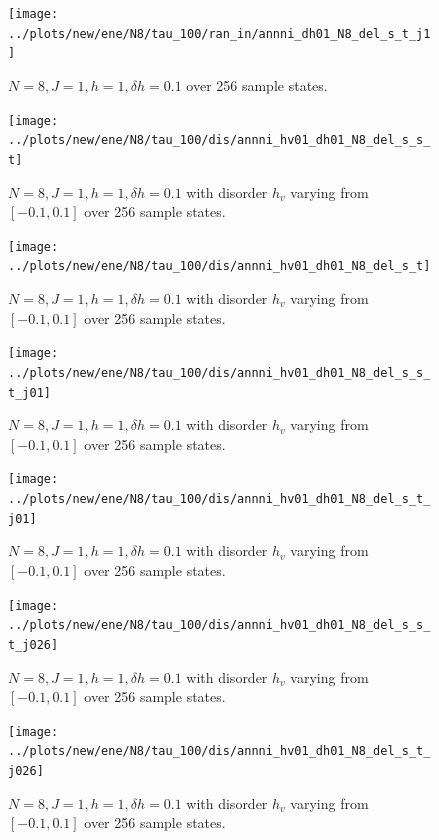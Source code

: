 \documentclass[a4paper]{article}
\begin{document}
\begin{figure}[h!]
  \centering
  \texttt{[image: ../plots/new/ene/N8/tau\_100/ran\_in/annni\_dh01\_N8\_del\_s\_t\_j1]}
  \caption{$N = 8, J = 1, h = 1, \delta h=0.1$ over 256 sample states.}
  \label{fig:}
\end{figure}



\begin{figure}[h!]
  \centering
  \texttt{[image: ../plots/new/ene/N8/tau\_100/dis/annni\_hv01\_dh01\_N8\_del\_s\_s\_t]}
  \caption{$N = 8, J = 1, h = 1, \delta h=0.1$ with disorder $h_v$ varying from $[-0.1,0.1]$ over 256 sample states.}
  \label{fig:}
\end{figure}

\begin{figure}[h!]
  \centering
  \texttt{[image: ../plots/new/ene/N8/tau\_100/dis/annni\_hv01\_dh01\_N8\_del\_s\_t]}
  \caption{$N = 8, J = 1, h = 1, \delta h=0.1$ with disorder $h_v$ varying from $[-0.1,0.1]$ over 256 sample states.}
  \label{fig:}
\end{figure}

\begin{figure}[h!]
  \centering
  \texttt{[image: ../plots/new/ene/N8/tau\_100/dis/annni\_hv01\_dh01\_N8\_del\_s\_s\_t\_j01]}
  \caption{$N = 8, J = 1, h = 1, \delta h=0.1$ with disorder $h_v$ varying from $[-0.1,0.1]$ over 256 sample states.}
  \label{fig:}
\end{figure}

\begin{figure}[h!]
  \centering
  \texttt{[image: ../plots/new/ene/N8/tau\_100/dis/annni\_hv01\_dh01\_N8\_del\_s\_t\_j01]}
  \caption{$N = 8, J = 1, h = 1, \delta h=0.1$ with disorder $h_v$ varying from $[-0.1,0.1]$ over 256 sample states.}
  \label{fig:}
\end{figure}

\begin{figure}[h!]
  \centering
  \texttt{[image: ../plots/new/ene/N8/tau\_100/dis/annni\_hv01\_dh01\_N8\_del\_s\_s\_t\_j026]}
  \caption{$N = 8, J = 1, h = 1, \delta h=0.1$ with disorder $h_v$ varying from $[-0.1,0.1]$ over 256 sample states.}
  \label{fig:}
\end{figure}

\begin{figure}[h!]
  \centering
  \texttt{[image: ../plots/new/ene/N8/tau\_100/dis/annni\_hv01\_dh01\_N8\_del\_s\_t\_j026]}
  \caption{$N = 8, J = 1, h = 1, \delta h=0.1$ with disorder $h_v$ varying from $[-0.1,0.1]$ over 256 sample states.}
  \label{fig:}
\end{figure}
\end{document}

